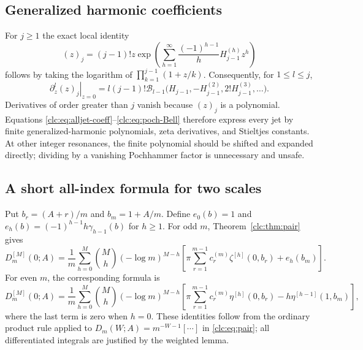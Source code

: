 \documentclass[11pt,a4paper]{article}
\numberwithin{equation}{section}
\theoremstyle{definition}\newtheorem{definition}[theorem]{Definition}
\theoremstyle{remark}\newtheorem{remark}[theorem]{Remark}
\begin{document}
\subsection{Generalized harmonic coefficients}
For $j\ge1$ the exact local identity
\begin{equation}\label{clc:eq:poch-harmonic}
 (z)_j=(j-1)!z\exp\left(
       \sum_{h=1}^\infty\frac{(-1)^{h-1}}h H_{j-1}^{(h)}z^h\right)
\end{equation}
follows by taking the logarithm of
$\prod_{k=1}^{j-1}(1+z/k)$. Consequently, for $1\le l\le j$,
\begin{equation}\label{clc:eq:poch-Bell}
 \left.\partial_z^l(z)_j\right|_{z=0}
 =l(j-1)!\mathcal B_{l-1}
 \bigl(H_{j-1},-H_{j-1}^{(2)},2!H_{j-1}^{(3)},\ldots\bigr).
\end{equation}
Derivatives of order greater than $j$ vanish because $(z)_j$ is a
polynomial. Equations \eqref{clc:eq:alljet-coeff}--\eqref{clc:eq:poch-Bell}
therefore express every jet by finite generalized-harmonic polynomials,
zeta derivatives, and Stieltjes constants. At other integer resonances,
the finite polynomial should be shifted and expanded directly; dividing
by a vanishing Pochhammer factor is unnecessary and unsafe.

\subsection{A short all-index formula for two scales}
Put $b_r=(A+r)/m$ and $b_m=1+A/m$. Define
$e_0(b)=1$ and $e_h(b)=(-1)^{h-1}h\gamma_{h-1}(b)$ for $h\ge1$.
For odd $m$, Theorem~\ref{clc:thm:pair} gives
\begin{equation}\label{clc:eq:odd-pair-jet}
 \boxed{\displaystyle
 D_m^{[M]}(0;A)=\frac1m\sum_{h=0}^M\binom Mh(-\log m)^{M-h}
 \left[\pi\sum_{r=1}^{m-1}c_r^{(m)}\zeta^{[h]}(0,b_r)
                       +e_h(b_m)\right].}
\end{equation}
For even $m$, the corresponding formula is
\begin{equation}\label{clc:eq:even-pair-jet}
 \boxed{\displaystyle
 D_m^{[M]}(0;A)=\frac1m\sum_{h=0}^M\binom Mh(-\log m)^{M-h}
 \left[\pi\sum_{r=1}^{m-1}c_r^{(m)}\eta^{[h]}(0,b_r)
               -h\eta^{[h-1]}(1,b_m)\right],}
\end{equation}
where the last term is zero when $h=0$. These identities follow from
the ordinary product rule applied to
$D_m(W;A)=m^{-W-1}[\cdots]$ in \eqref{clc:eq:pair}; all differentiated
integrals are justified by the weighted lemma.
\end{document}
